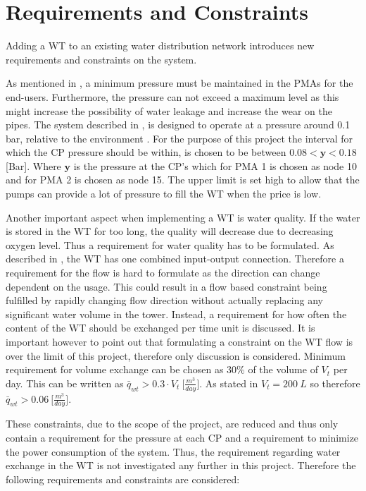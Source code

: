\chapter{Requirements and Constraints}
\label{Requirements_and_constraints}

Adding a WT to an existing water distribution network introduces new requirements and constraints on the system. 

As mentioned in , a minimum pressure must be maintained in the PMAs for the end-users. Furthermore, the pressure can not exceed a maximum level as this might increase the possibility of water leakage and increase the wear on the pipes. The system described in , is designed to operate at a pressure around 0.1 bar, relative to the environment \cite{master_aau}. For the purpose of this project the interval for which the CP pressure should be within, is chosen to be between $0.08 < \bm{y} < 0.18$ [Bar]. Where $\bm{y}$ is the pressure at the CP's which for PMA 1 is chosen as node 10 and for PMA 2 is chosen as node 15. The upper limit is set high to allow that the pumps can provide a lot of pressure to fill the WT when the price is low. 

Another important aspect when implementing a WT is water quality. If the water is stored in the WT for too long, the quality will decrease due to decreasing oxygen level. Thus a requirement for water quality has to be formulated. As described in , the WT has one combined input-output connection. Therefore a requirement for the flow is hard to formulate as the direction can change dependent on the usage. This could result in a flow based constraint being fulfilled by rapidly changing flow direction without actually replacing any significant water volume in the tower. Instead, a requirement for how often the content of the WT should be exchanged per time unit is discussed. It is important however to point out that formulating a constraint on the WT flow is over the limit of this project, therefore only discussion is considered. 
Minimum requirement for volume exchange can be chosen as 30\% of the volume of $V_t$ per day. This can be written as $\bar{q}_{wt} > 0.3\cdot V_t \: \big[\frac{m^3}{day}\big]$. As stated in  $V_t = 200 \:L$ so therefore $\bar{q}_{wt} > 0.06 \: \big[\frac{m^3}{day}\big]$.

These constraints, due to the scope of the project, are reduced and thus only contain a requirement for the pressure at each CP and a requirement to minimize the power consumption of the system. Thus, the requirement regarding water exchange in the WT is not investigated any further in this project. 
Therefore the following requirements and constraints are considered:

